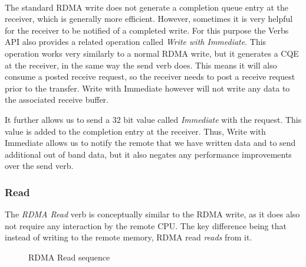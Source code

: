 \paragraph{} The standard RDMA write does not generate a completion queue entry at the receiver, 
which is generally more efficient.
However, sometimes it is very helpful for the receiver to be notified of a completed write. For this purpose the Verbs API 
also provides a related operation called \emph{Write with Immediate}.
This operation works very similarly to a normal RDMA write, but it generates a CQE at the receiver, in the same way 
the send verb does. This means it will also consume a posted receive request, so the receiver needs to post a receive request 
prior to the transfer. Write with Immediate however will not write any data to the associated receive buffer.

It further allows us to send a 32 bit value called \emph{Immediate} with the request. This value is added to
the completion entry at the receiver. Thus, Write with Immediate allows us to notify the remote that we have written data and to 
send additional out of band data, but it also negates any performance improvements over the send verb.


\subsubsection{Read}

The \emph{RDMA Read} verb is conceptually similar to the RDMA write, as it does also not require any interaction by the 
remote CPU. The key difference being that instead of writing to the remote memory, RDMA read \emph{reads} from it.


\begin{figure}[!htp]
\begin{center}
\end{center}
\caption{RDMA Read sequence}
\label{fig:seq-rd}
\end{figure}

